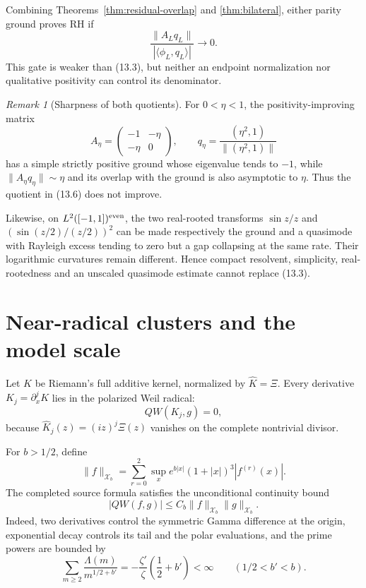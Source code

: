 \documentclass[11pt]{amsart}
\theoremstyle{definition}
\theoremstyle{remark}
\newtheorem{remark}[theorem]{Remark}
\newcommand{\XiR}{\Xi}
\begin{document}
Combining Theorems~\ref{thm:residual-overlap} and
\ref{thm:bilateral}, either parity ground proves RH if
\[
 \boxed{
 \frac{\|A_Lq_L\|}{|\langle\phi_L,q_L\rangle|}\longrightarrow0.}
 \tag{13.6}
\]
This gate is weaker than (13.3), but neither an endpoint normalization nor
qualitative positivity can control its denominator.

\begin{remark}[Sharpness of both quotients]
For \(0<\eta<1\), the positivity-improving matrix
\[
 A_\eta=\begin{pmatrix}-1&-\eta\\-\eta&0\end{pmatrix},
 \qquad q_\eta=\frac{(\eta^2,1)}{\|(\eta^2,1)\|}
\]
has a simple strictly positive ground whose eigenvalue tends to \(-1\),
while \(\|A_\eta q_\eta\|\sim\eta\) and its overlap with the ground is also
asymptotic to \(\eta\).  Thus the quotient in (13.6) does not improve.

Likewise, on \(L^2([-1,1])^{\rm even}\), the two real-rooted transforms
\(\sin z/z\) and \((\sin(z/2)/(z/2))^2\) can be made respectively the ground
and a quasimode with Rayleigh excess tending to zero but a gap collapsing at
the same rate.  Their logarithmic curvatures remain different.  Hence
compact resolvent, simplicity, real-rootedness and an unscaled quasimode
estimate cannot replace (13.3).
\end{remark}

\section{Near-radical clusters and the model scale}
\label{sec:cluster}

Let \(K\) be Riemann's full additive kernel, normalized by
\(\widehat K=\XiR\).  Every derivative \(K_j=\partial_x^jK\) lies in the
polarized Weil radical:
\[
 QW(K_j,g)=0,
 \tag{14.1}
\]
because \(\widehat K_j(z)=(iz)^j\XiR(z)\) vanishes on the complete
nontrivial divisor.

For \(b>1/2\), define
\[
 \|f\|_{\mathcal X_b}
 =\sum_{r=0}^2\sup_x
 e^{b|x|}(1+|x|)^3|f^{(r)}(x)|.
\]
The completed source formula satisfies the unconditional continuity bound
\[
 \boxed{|QW(f,g)|\le C_b\|f\|_{\mathcal X_b}\|g\|_{\mathcal X_b}.}
 \tag{14.2}
\]
Indeed, two derivatives control the symmetric Gamma difference at the
origin, exponential decay controls its tail and the polar evaluations, and
the prime powers are bounded by
\[
 \sum_{m\ge2}\frac{\Lambda(m)}{m^{1/2+b'}}
 =-\frac{\zeta'}\zeta\left(\frac12+b'\right)<\infty
 \qquad(1/2<b'<b).
\]
\end{document}
